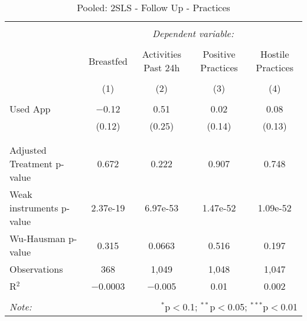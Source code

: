 
\begin{table}[!htbp] \centering 
  \caption{Pooled: 2SLS - Follow Up - Practices} 
  \label{tbl:Pooled: 2SLS - Follow Up - Practices} 
\begin{tabular}{@{\extracolsep{5pt}}lcccc} 
\\[-1.8ex]\hline 
\hline \\[-1.8ex] 
 & \multicolumn{4}{c}{\textit{Dependent variable:}} \\ 
\cline{2-5} 
\\[-1.8ex] & Breastfed & Activities Past 24h & Positive Practices & Hostile Practices \\ 
\\[-1.8ex] & (1) & (2) & (3) & (4)\\ 
\hline \\[-1.8ex] 
 Used App & $-$0.12 & 0.51 & 0.02 & 0.08 \\ 
  & (0.12) & (0.25) & (0.14) & (0.13) \\ 
  & & & & \\ 
\hline \\[-1.8ex] 
Adjusted Treatment p-value & 0.672 & 0.222 & 0.907 & 0.748 \\ 
Weak instruments p-value & 2.37e-19 & 6.97e-53 & 1.47e-52 & 1.09e-52 \\ 
Wu-Hausman p-value & 0.315 & 0.0663 & 0.516 & 0.197 \\ 
Observations & 368 & 1,049 & 1,048 & 1,047 \\ 
R$^{2}$ & $-$0.0003 & $-$0.005 & 0.01 & 0.002 \\ 
\hline 
\hline \\[-1.8ex] 
\textit{Note:}  & \multicolumn{4}{r}{$^{*}$p$<$0.1; $^{**}$p$<$0.05; $^{***}$p$<$0.01} \\ 
\end{tabular} 
\end{table} 
